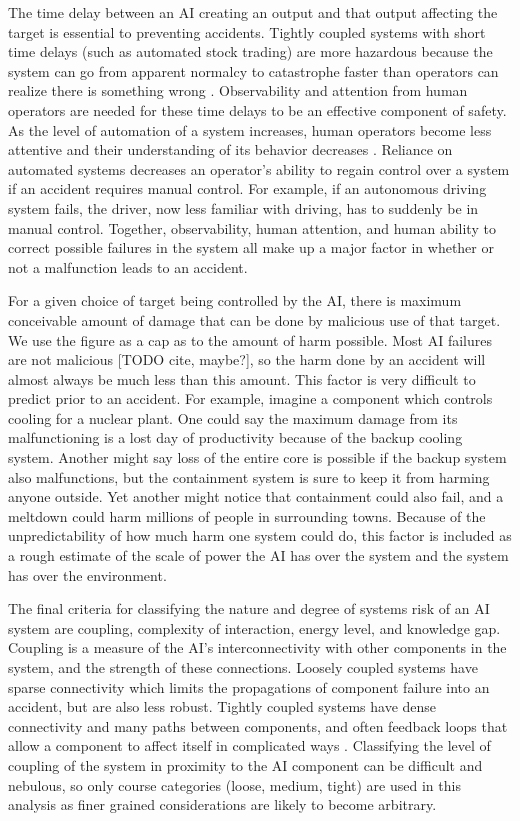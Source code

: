 \documentclass[11pt]{article}
\begin{document}
The time delay between an AI creating an output and that output affecting the target is essential to
preventing accidents.  Tightly coupled systems with short time delays (such as automated stock
trading) are more hazardous because the system can go from apparent normalcy to catastrophe faster
than operators can realize there is something wrong \cite{andrei2017flash}.
Observability and attention from human operators are needed for these time delays to be an effective
component of safety. As the level of automation of a system increases, human operators become less
attentive and their understanding of its behavior decreases \cite{bainbridge1983ironies}. Reliance
on automated systems decreases an operator's ability to regain control over a system if an accident
requires manual control. For example, if an autonomous driving system fails, the driver, now less
familiar with driving, has to suddenly be in manual control. Together, observability, human
attention, and human ability to correct possible failures in the system all make up a major factor
in whether or not a malfunction leads to an accident.

For a given choice of target being controlled by the AI, there is maximum conceivable amount of
damage that can be done by malicious use of that target. We use the figure as a cap as to the amount
of harm possible. Most AI failures are not malicious [TODO cite, maybe?], so the harm done by an
accident will almost always be much less than this amount. This factor is very difficult to predict
prior to an accident. For example, imagine a component which controls cooling for a nuclear plant.
One could say the maximum damage from its malfunctioning is a lost day of productivity because of
the backup cooling system. Another might say loss of the entire core is possible if the backup
system also malfunctions, but the containment system is sure to keep it from harming anyone outside.
Yet another might notice that containment could also fail, and a meltdown could harm millions of
people in surrounding towns. Because of the unpredictability of how much harm one system could do,
this factor is included as a rough estimate of the scale of power the AI has over the system and the
system has over the environment. 

The final criteria for classifying the nature and degree of systems risk of an AI system are
coupling, complexity of interaction, energy level, and knowledge gap. Coupling is a measure of the
AI's interconnectivity with other components in the system, and the strength of these connections.
Loosely coupled systems have sparse connectivity which limits the propagations of component failure
into an accident, but are also less robust. Tightly coupled systems have dense connectivity and many
paths between components, and often feedback loops that allow a component to affect itself in
complicated ways \cite{perrow1984living}. Classifying the level of coupling of the system in
proximity to the AI component can be difficult and nebulous, so only course categories (loose,
medium, tight) are used in this analysis as finer grained considerations are likely to become
arbitrary.
\end{document}
